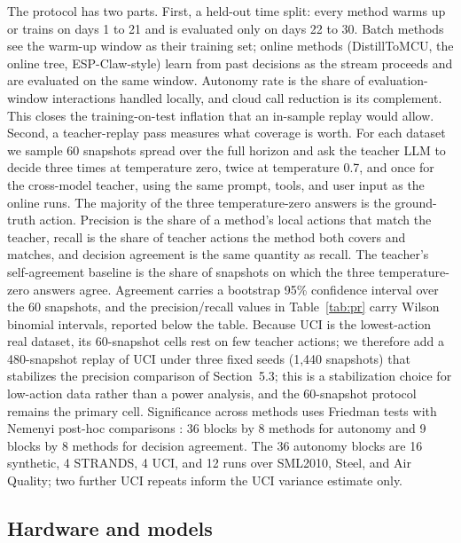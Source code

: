 \documentclass[11pt,a4paper]{article}
\begin{document}
The protocol has two parts. First, a held-out time split: every method warms
up or trains on days 1 to 21 and is evaluated only on days 22 to 30. Batch
methods see the warm-up window as their training set; online methods
(DistillToMCU, the online tree, ESP-Claw-style) learn from past decisions as
the stream proceeds and are evaluated on the same window. Autonomy rate is
the share of evaluation-window interactions handled locally, and cloud call
reduction is its complement. This closes the training-on-test inflation that
an in-sample replay would allow. Second, a teacher-replay pass measures what
coverage is worth. For each dataset we sample 60 snapshots spread over the
full horizon and ask the teacher LLM to decide three times at temperature
zero, twice at temperature 0.7, and once for the cross-model teacher, using
the same prompt, tools, and user input as the online runs. The majority of
the three temperature-zero answers is the ground-truth action. Precision is
the share of a method's local actions that match the teacher, recall is the
share of teacher actions the method both covers and matches, and decision
agreement is the same quantity as recall. The teacher's self-agreement
baseline is the share of snapshots on which the three temperature-zero answers
agree. Agreement carries a bootstrap 95\% confidence interval over the 60
snapshots, and the precision/recall values in Table~\ref{tab:pr} carry Wilson
binomial intervals, reported below the table. Because UCI is the
lowest-action real dataset, its 60-snapshot cells rest on few teacher
actions; we therefore add a 480-snapshot replay of UCI under three fixed
seeds (1,440 snapshots) that stabilizes the precision comparison of
Section~5.3; this is a stabilization choice for low-action data rather than
a power analysis, and the 60-snapshot protocol remains the primary cell.
Significance across methods uses Friedman tests with Nemenyi
post-hoc comparisons \cite{30}: 36 blocks by 8 methods for autonomy and 9
blocks by 8 methods for decision agreement. The 36 autonomy blocks are 16
synthetic, 4 STRANDS, 4 UCI, and 12 runs over SML2010, Steel, and Air
Quality; two further UCI repeats inform the UCI variance estimate only.

\subsection{Hardware and models}
\end{document}
